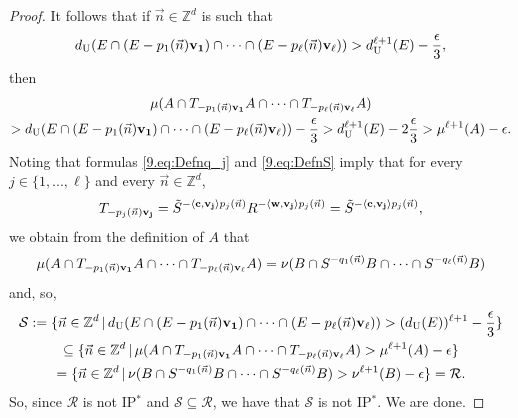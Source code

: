 \documentclass[11pt,american,preprint]{elsarticle}
\numberwithin{equation}{section}
\theoremstyle{plain}
\theoremstyle{plain*}
\theoremstyle{plain}
\theoremstyle{plain*}
\theoremstyle{plain}
\theoremstyle{plain*}
\theoremstyle{remark}
\theoremstyle{remark*}
\theoremstyle{remark}
\theoremstyle{remark*}
\theoremstyle{remark}
\theoremstyle{remark*}
\theoremstyle{plain}
\theoremstyle{definition}
\theoremstyle{plain}
\theoremstyle{plain} %
\newcommand{\Z}{\mathbb{Z}}
\begin{document}
\begin{proof}
It follows that if $\vec n\in\Z^d$ is such that  
$$d_{{\rm U}}(E\cap (E-p_1(\vec n){\bf v_1})\cap\cdots\cap (E-p_\ell(\vec n){\bf v_\ell}))> d_{{\rm U}}^{\ell+1}(E)-\frac{\epsilon}{3},$$
then 
\begin{multline*}
    \mu(A\cap T_{-p_1(\vec n){\bf v_1}}A\cap \cdots\cap T_{-p_\ell(\vec n){\bf v_\ell}}A)\\
    >
    d_{{\rm U}}(E\cap (E-p_1(\vec n){\bf v_1})\cap\cdots\cap (E-p_\ell(\vec n){\bf v_\ell}))-\frac{\epsilon}{3}
   > d_{{\rm U}}^{\ell+1}(E)-2\frac{\epsilon}{3}>\mu^{\ell+1}(A)-\epsilon.
\end{multline*}
Noting that formulas \eqref{9.eq:Defnq_j} and \eqref{9.eq:DefnS} imply that for every $j\in\{1,...,\ell\}$ and every $\vec n\in\Z^d$,
$$
T_{-p_j(\vec n){\bf v_j}}=\tilde S^{-\langle {\bf c},{\bf v_j}\rangle p_j(\vec n)}R^{-\langle {\bf w},{\bf v_j}\rangle p_j(\vec n)}=\tilde S^{-\langle {\bf c},{\bf v_j}\rangle p_j(\vec n)},
$$
we obtain  from the definition of $A$ that 
$$
\mu(A\cap T_{-p_1(\vec n){\bf v_1}}A\cap \cdots\cap T_{-p_\ell(\vec n){\bf v_\ell}}A)=
\nu(B\cap S^{- q_1(\vec n)}B\cap \cdots\cap S^{-q_\ell(\vec n)}B)
$$
and, so, 
\begin{multline*}
\mathcal S:=\{\vec n\in\Z^d\,|\, d_{{\rm U}}(E\cap (E-p_1(\vec n){\bf v_1})\cap\cdots\cap (E-p_\ell(\vec n){\bf v_\ell}))>(d_{{\rm U}}(E))^{\ell+1}-\frac{\epsilon}{3}\}\\
\subseteq \{\vec n\in \Z^d\,|\,\mu(A\cap T_{-p_1(\vec n){\bf v_1}}A\cap \cdots\cap T_{-p_\ell(\vec n){\bf v_\ell}}A)>\mu^{\ell+1}(A)-\epsilon\}\\
= \{\vec n\in\Z^d\,|\,\nu(B\cap S^{- q_1(\vec n)}B\cap \cdots\cap S^{-q_\ell(\vec n)}B)
> \nu^{\ell+1}(B)-\epsilon\}= \mathcal R.
\end{multline*}
So, since $\mathcal R$ is not IP$^*$ and $\mathcal S\subseteq \mathcal R$, we have that $\mathcal S$ is not IP$^*$. We are done.
\end{proof}
\end{document}
